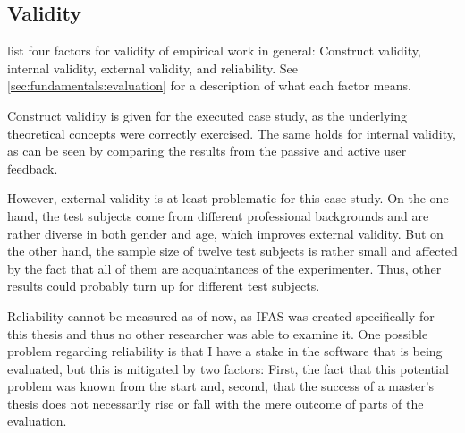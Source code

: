 

\FloatBarrier

\subsection{Validity}
\label{subec:evaluation:user:validity}

\citet{Easterbrook2008} list four factors for validity of empirical work in general: Construct validity, internal validity, external validity, and reliability.
See \cref{sec:fundamentals:evaluation} for a description of what each factor means.

Construct validity is given for the executed case study, as the underlying theoretical concepts were correctly exercised.
The same holds for internal validity, as can be seen by comparing the results from the passive and active user feedback.

However, external validity is at least problematic for this case study.
On the one hand, the test subjects come from different professional backgrounds and are rather diverse in both gender and age, which improves external validity.
But on the other hand, the sample size of twelve test subjects is rather small and affected by the fact that all of them are acquaintances of the experimenter.
Thus, other results could probably turn up for different test subjects.

Reliability cannot be measured as of now, as \ac{IFAS} was created specifically for this thesis and thus no other researcher was able to examine it.
One possible problem regarding reliability is that I have a stake in the software that is being evaluated, but this is mitigated by two factors:
First, the fact that this potential problem was known from the start and, second, that the success of a master's thesis does not necessarily rise or fall with the mere outcome of parts of the evaluation.

